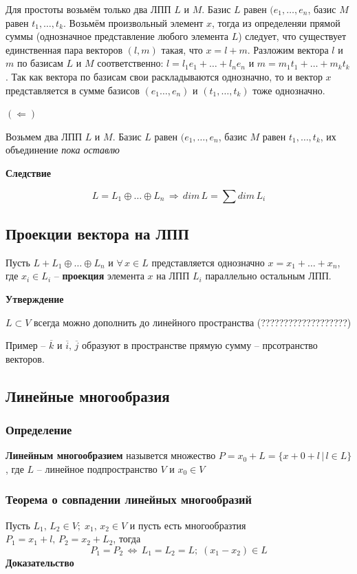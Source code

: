 \documentclass{article}
\begin{document}
\begin{enumerate}
    Для простоты возьмём только два ЛПП $L$ и $M$. Базис $L$ равен $(e_1,\ldots,e_n$, базис $M$ равен $t_1,\ldots,t_k$. Возьмём произвольный элемент $x$, тогда из определеняи прямой суммы (однозначное представление любого элемента $L$) следует, что существует единственная пара векторов $(l,m)$ такая, что $x=l+m$. Разложим вектора $l$ и $m$ по базисам $L$ и $M$ соответственно: $l=l_1e_1+\ldots+l_n e_n$ и $m=m_1t_1+\ldots+m_k t_k$. Так как вектора по базисам свои раскладываются однозначно, то и вектор $x$ представляется в сумме базисов $(e_1\ldots,e_n)$ и $(t_1,\ldots,t_k)$ тоже однозначно.
    
    $(\Leftarrow)$
    
    Возьмем два ЛПП $L$ и $M$. Базис $L$ равен $(e_1,\ldots,e_n$, базис $M$ равен $t_1,\ldots,t_k$, их объединение \textit{пока оставлю}
\end{enumerate}
\textbf{Следствие}

$$L=L_1\oplus \ldots\oplus L_n\,\Rightarrow\,dim\,L=\sum dim\,L_i$$
\subsection{Проекции вектора на ЛПП}
Пусть $L+L_1\oplus\ldots\oplus L_n$ и $\forall\,x\in L$ представляется однозначно $x=x_1+\ldots+x_n$, где $x_i\in L_i$ -- \textbf{проекция} элемента $x$ на ЛПП $L_i$ параллельно остальным ЛПП.

\textbf{Утверждение}

$L\subset V$ всегда можно дополнить до линейного пространства (???????????????????)

Пример -- $\overline{k}$ и $\overline{i},\,\overline{j}$ образуют в пространстве прямую сумму -- прсотранство векторов.
\newpage
\subsection{Линейные многообразия}
\subsubsection{Определение}
\textbf{Линейным многообразием} назывется множество $P=x_0+L=\{x+0+l\,|\,l\in L\}$, где $L$ -- линейное подпространство $V$ и $x_0\in V$

\subsubsection{Теорема о совпадении линейных многообразий}

Пусть $L_1,\,L_2\in V;\;x_1,\,x_2\in V$ и пусть есть многообразтия $P_1=x_1+l,\,P_2=x_2+L_2$, тогда
$$ P_1=P_2\,\Leftrightarrow\,L_1=L_2=L;\;(x_1-x_2)\in L $$
\textbf{Доказательство}
\end{document}

